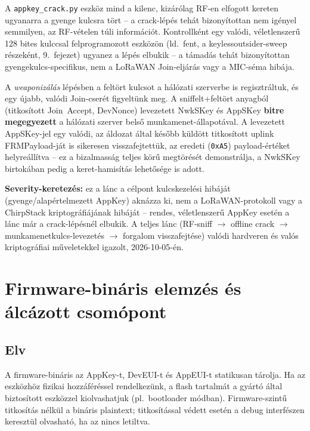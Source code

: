 \documentclass[12pt,a4paper]{article}
\begin{document}
A \texttt{appkey\_crack.py} eszköz mind a kilenc, kizárólag RF-en elfogott
kereten ugyanarra a gyenge kulcsra tört -- a crack-lépés tehát bizonyítottan
nem igényel semmilyen, az RF-vételen túli információt. Kontrollként egy
valódi, véletlenszerű 128 bites kulccsal felprogramozott eszközön (ld.\
fent, a keylessoutsider-sweep részeként, 9.\ fejezet) ugyanez a lépés
elbukik -- a támadás tehát bizonyítottan gyengekulcs-specifikus, nem a
LoRaWAN Join-eljárás vagy a MIC-séma hibája.

A \emph{weaponizálás} lépésben a feltört kulcsot a hálózati szerverbe is
regisztráltuk, és egy újabb, valódi Join-cserét figyeltünk meg. A
sniffelt+feltört anyagból (titkosított Join~Accept, DevNonce) levezetett
NwkSKey és AppSKey \textbf{bitre megegyezett} a hálózati szerver belső
munkamenet-állapotával. A levezetett AppSKey-jel egy valódi, az áldozat
által később küldött titkosított uplink FRMPayload-ját is sikeresen
visszafejtettük, az eredeti (\texttt{0xA5}) payload-értéket helyreállítva --
ez a bizalmasság teljes körű megtörését demonstrálja, a NwkSKey birtokában
pedig a keret-hamisítás lehetősége is adott.

\textbf{Severity-keretezés:} ez a lánc a célpont kulcskezelési hibáját
(gyenge/alapértelmezett AppKey) aknázza ki, nem a LoRaWAN-protokoll vagy a
ChirpStack kriptográfiájának hibáját -- rendes, véletlenszerű AppKey esetén
a lánc már a crack-lépésnél elbukik. A teljes lánc (RF-sniff $\to$ offline
crack $\to$ munkamenetkulcs-levezetés $\to$ forgalom visszafejtése) valódi
hardveren és valós kriptográfiai műveletekkel igazolt, 2026-10-05-én.

\section{Firmware-bináris elemzés és álcázott csomópont}

\subsection{Elv}

A firmware-bináris az AppKey-t, DevEUI-t és AppEUI-t statikusan tárolja.
Ha az eszközhöz fizikai hozzáféréssel rendelkezünk, a flash tartalmát
a gyártó által biztosított eszközzel kiolvashatjuk (pl.\ bootloader módban).
Firmware-szintű titkosítás nélkül a bináris plaintext; titkosítással védett
esetén a debug interfészen keresztül olvasható, ha az nincs letiltva.
\end{document}
